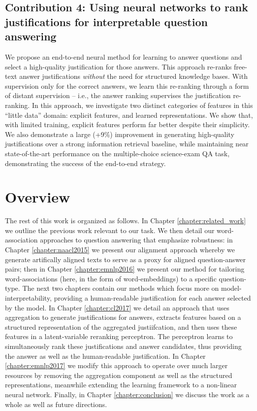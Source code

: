 \subsection{Contribution 4: Using neural networks to rank justifications for interpretable question answering} We propose an end-to-end neural method for learning to answer questions and select a high-quality justification for those answers. 
This approach re-ranks free-text answer justifications \emph{without} the need for structured knowledge bases. 
With supervision only for the correct answers, we learn this re-ranking through a form of distant supervision -- i.e., the answer ranking supervises the justification re-ranking. In this approach, we investigate two distinct categories of features in this ``little data'' domain: explicit features, and learned representations. We show that, with limited training, explicit features perform far better despite their simplicity.  We also demonstrate a large (+9\%) improvement in generating high-quality justifications over a strong information retrieval baseline, while maintaining near state-of-the-art performance on the multiple-choice science-exam QA task, demonstrating the success of the end-to-end strategy.




\section{Overview\label{sec:overview}}

The rest of this work is organized as follows.  In Chapter \ref{chapter:related_work} we outline the previous work relevant to our task.
We then detail our word-association approaches to question answering that emphasize robustness: in Chapter \ref{chapter:naacl2015} we present our alignment approach whereby we generate artifically aligned texts to serve as a proxy for aligned question-answer pairs; then in Chapter \ref{chapter:emnlp2016} we present our method for tailoring word-associations (here, in the form of word-embeddings) to a specific question-type.  The next two chapters contain our methods which focus more on model-interpretability, providing a human-readable justification for each answer selected by the model.  In Chapter \ref{chapter:cl2017} we detail an approach that uses aggregation to generate justifications for answers, extracts features based on a structured representation of the aggregated justiifcation, and then uses these features in a latent-variable reranking perceptron.  The perceptron learns to simultaneously rank these justifications and answer candidates, thus providing the answer as well as the human-readable justification.  In Chapter \ref{chapter:emnlp2017} we modify this approach to operate over much larger resources by removing the aggregation component as well as the structured representations, meanwhile extending the learning framework to a non-linear neural network.  Finally, in Chapter \ref{chapter:conclusion} we discuss the work as a whole as well as future directions.
